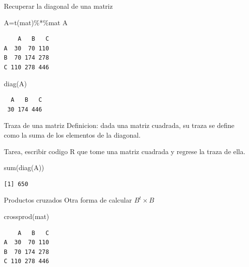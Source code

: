 \documentclass[
  ignorenonframetext,
  aspectratio=169,
  spanish,
]{beamer}
\newenvironment{Shaded}{\begin{snugshade}}{\end{snugshade}}
\newcommand{\FunctionTok}[1]{\textcolor[rgb]{0.28,0.35,0.67}{#1}}
\newcommand{\NormalTok}[1]{\textcolor[rgb]{0.00,0.23,0.31}{#1}}
\newcommand{\OtherTok}[1]{\textcolor[rgb]{0.00,0.23,0.31}{#1}}
\newcommand{\SpecialCharTok}[1]{\textcolor[rgb]{0.37,0.37,0.37}{#1}}
\begin{document}
\begin{frame}[fragile]{Recuperar la diagonal de una matriz}
\label{recuperar-la-diagonal-de-una-matriz}
\begin{Shaded}
\begin{Highlighting}[]
\NormalTok{A}\OtherTok{=}\FunctionTok{t}\NormalTok{(mat)}\SpecialCharTok{\%*\%}\NormalTok{mat }
\NormalTok{A}
\end{Highlighting}
\end{Shaded}

\begin{verbatim}
    A   B   C
A  30  70 110
B  70 174 278
C 110 278 446
\end{verbatim}

\begin{Shaded}
\begin{Highlighting}[]
\FunctionTok{diag}\NormalTok{(A)}
\end{Highlighting}
\end{Shaded}

\begin{verbatim}
  A   B   C 
 30 174 446 
\end{verbatim}
\end{frame}

\begin{frame}[fragile]{Traza de una matriz}
\label{traza-de-una-matriz}
Definicion: dada una matriz cuadrada, su traza se define como la suma de
los elementos de la diagonal.

Tarea, escribir codigo R que tome una matriz cuadrada y regrese la traza
de ella.

\begin{Shaded}
\begin{Highlighting}[]
\FunctionTok{sum}\NormalTok{(}\FunctionTok{diag}\NormalTok{(A))}
\end{Highlighting}
\end{Shaded}

\begin{verbatim}
[1] 650
\end{verbatim}
\end{frame}

\begin{frame}[fragile]{Productos cruzados}
\label{productos-cruzados}
Otra forma de calcular \(B^t\times B\)

\begin{Shaded}
\begin{Highlighting}[]
\FunctionTok{crossprod}\NormalTok{(mat)}
\end{Highlighting}
\end{Shaded}

\begin{verbatim}
    A   B   C
A  30  70 110
B  70 174 278
C 110 278 446
\end{verbatim}
\end{frame}
\end{document}
